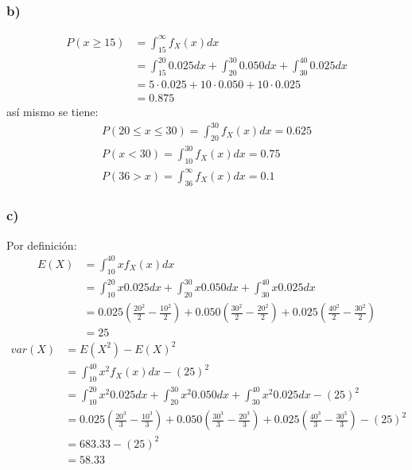 \documentclass{article}
\begin{document}
\begin{tcolorbox}[breakable]
    \subsubsection*{b)}
    \begin{align*}
        P (x\geq 15) 
        &= \int_{15}^\infty f_X(x) dx \\
        &= \int_{15}^{20} 0.025dx + \int_{20}^{30} 0.050dx + \int_{30}^{40} 0.025dx \\
        &= 5 \cdot 0.025 + 10 \cdot 0.050 + 10 \cdot 0.025 \\
        &= 0.875
    \end{align*}
    así mismo se tiene:
    \begin{align*}
        P(20 \leq x \leq 30) = \int_{20}^{30} f_X(x)dx = 0.625 \\
        P(x < 30) = \int_{10}^{30} f_X(x)dx = 0.75 \\
        P(36 > x ) = \int_{36}^\infty f_X(x)dx = 0.1
    \end{align*}

    \subsubsection*{c)}
    Por definición:
    \begin{align*}
        E(X) 
        &= \int_{10}^{40} xf_X(x)dx \\
        &= \int_{10}^{20} x0.025dx + \int_{20}^{30} x0.050dx + \int_{30}^{40} x0.025dx \\
        &= 0.025(\tfrac{20^2}{2}-\tfrac{10^2}{2})+ 0.050(\tfrac{30^2}{2}-\tfrac{20^2}{2}) + 0.025(\tfrac{40^2}{2}-\tfrac{30^2}{2}) \\
        &= 25
    \end{align*}
    \begin{align*}
        var(X)
        &= E(X^2)-E(X)^2 \\
        &= \int_{10}^{40}x^2f_X(x)dx - (25)^2 \\
        &= \int_{10}^{20} x^2 0.025dx + \int_{20}^{30} x^2 0.050dx + \int_{30}^{40} x^2 0.025dx - (25)^2 \\
        &= 0.025(\tfrac{20^3}{3}-\tfrac{10^3}{3})+ 0.050(\tfrac{30^3}{3}-\tfrac{20^3}{3}) + 0.025(\tfrac{40^3}{3}-\tfrac{30^3}{3}) - (25)^2 \\
        &= 683.33 - (25)^2\\
        &= 58.33
    \end{align*}
\end{tcolorbox}
\end{document}
